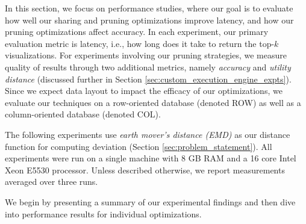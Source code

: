 In this section, we focus on performance studies, where our goal is to evaluate how well our sharing and pruning
optimizations improve latency, and how our pruning optimizations affect accuracy.
In each experiment, our primary evaluation metric is latency, i.e., 
how long does it take \SeeDB to return the top-$k$ visualizations. 
For experiments involving our pruning strategies, we measure quality of results through two additional
metrics, namely {\it accuracy} and {\it utility distance} (discussed further in Section 
\ref{sec:custom_execution_engine_expts}).
Since we expect data layout to impact the efficacy of our optimizations, we 
evaluate our techniques on a row-oriented database (denoted ROW) as well as a column-oriented database (denoted COL).

The following experiments use {\it earth mover's distance (EMD)} as our distance function for
computing deviation (Section \ref{sec:problem_statement}).
All experiments were run on a single machine with 8 GB RAM and a 16 core Intel 
Xeon E5530 processor. 
Unless described otherwise, we report measurements averaged over three runs.

We begin by presenting a summary of our experimental findings and then dive into performance results 
for individual optimizations.












